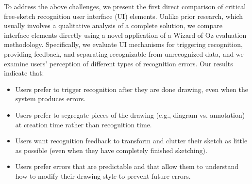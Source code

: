 \documentclass{elsart}
\begin{document}
  
To address the above challenges, we present the first direct
comparison of critical free-sketch recognition user interface (UI)
elements.  Unlike prior research, which usually involves a qualitative
analysis of a complete solution, we compare interface elements
directly using a novel application of a Wizard of Oz evaluation
methodology.  Specifically, we evaluate UI mechanisms for triggering
recognition, providing feedback, and separating recognizable from
unrecognized data, and we examine users' perception of different types
of recognition errors.  Our results indicate that:
\begin{itemize}
\item Users prefer to trigger recognition after they are done drawing,
  even when the system produces errors.
\item Users prefer to segregate pieces of the drawing (e.g., diagram
  vs. annotation) at creation time rather than recognition time.
\item Users want recognition feedback to transform and clutter their
  sketch as little as possible (even when they have completely finished sketching).
\item Users prefer errors that are predictable and that allow them to
 understand how to modify their drawing style to prevent future errors.
\end{itemize}


\end{document}
